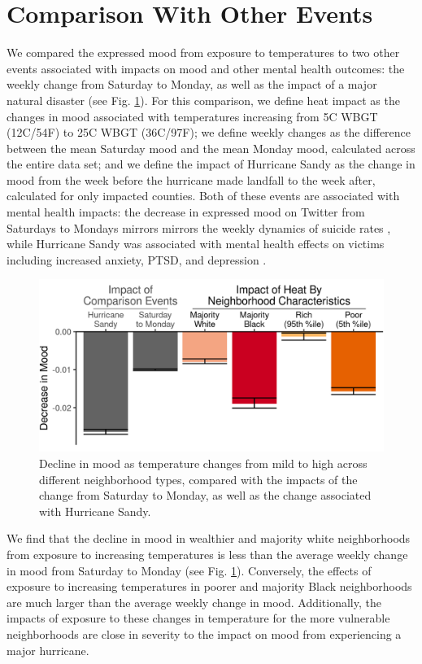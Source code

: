 \documentclass[fleqn,10pt]{wlscirep}
\begin{document}
\section*{Comparison With Other Events}
We compared the expressed mood from exposure to temperatures to two other events associated with impacts on mood and other mental health outcomes: the weekly change from Saturday to Monday, as well as the impact of a major natural disaster (see Fig. \ref{fig:compare}). For this comparison, we define heat impact as the changes in mood associated with temperatures increasing from 5\textdegree C WBGT (12\textdegree C/54\textdegree F) to 25\textdegree C WBGT (36\textdegree C/97\textdegree F); we define weekly changes as the difference between the mean Saturday mood and the mean Monday mood, calculated across the entire data set; and we define the impact of Hurricane Sandy as the change in mood from the week before the hurricane made landfall to the week after, calculated for only impacted counties. Both of these events are associated with mental health impacts: the decrease in expressed mood on Twitter from Saturdays to Mondays mirrors mirrors the weekly dynamics of suicide rates \cite{CDC2021}, while Hurricane Sandy was associated with mental health effects on victims including increased anxiety, PTSD, and depression \cite{Schwartz2017Aug, Lieberman-Cribbin2017}.

\begin{figure}[H]
 \centering
 \includegraphics[width=0.66\linewidth]{../res/comparison_plot.png}
 \caption{Decline in mood as temperature changes from mild to high across different neighborhood types, compared with the impacts of the change from Saturday to Monday, as well as the change associated with Hurricane Sandy.}
 \label{fig:compare}
\end{figure}

We find that the decline in mood in wealthier and majority white neighborhoods from exposure to increasing temperatures is less than the average weekly change in mood from Saturday to Monday (see Fig. \ref{fig:compare}). Conversely, the effects of exposure to increasing temperatures in poorer and majority Black neighborhoods are much larger than the average weekly change in mood. Additionally, the impacts of exposure to these changes in temperature for the more vulnerable neighborhoods are close in severity to the impact on mood from experiencing a major hurricane.
\end{document}
